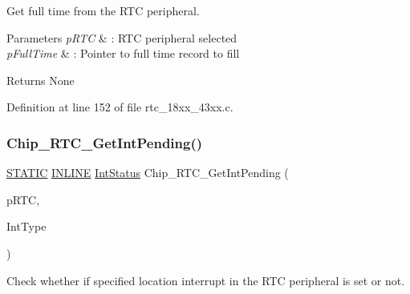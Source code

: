 Get full time from the R\+TC peripheral. 


\begin{DoxyParams}{Parameters}
{\em p\+R\+TC} & \+: R\+TC peripheral selected \\
\hline
{\em p\+Full\+Time} & \+: Pointer to full time record to fill \\
\hline
\end{DoxyParams}
\begin{DoxyReturn}{Returns}
None 
\end{DoxyReturn}


Definition at line 152 of file rtc\+\_\+18xx\+\_\+43xx.\+c.

\mbox{\label{group___r_t_c__18_x_x__43_x_x_gaab21524984ac344d4f508d2dfd6c5098}} 
\subsubsection{\texorpdfstring{Chip\+\_\+\+R\+T\+C\+\_\+\+Get\+Int\+Pending()}{Chip\_RTC\_GetIntPending()}}
{\footnotesize\ttfamily \hyperlink{group___l_p_c___types___public___macros_ga10b2d890d871e1489bb02b7e70d9bdfb}{S\+T\+A\+T\+IC} \hyperlink{spifi__18xx__43xx_8h_a2eb6f9e0395b47b8d5e3eeae4fe0c116}{I\+N\+L\+I\+NE} \hyperlink{group___l_p_c___types___public___types_gab7d263072f745b4f3913fb0afc434c4e}{Int\+Status} Chip\+\_\+\+R\+T\+C\+\_\+\+Get\+Int\+Pending (\begin{DoxyParamCaption}\item[{\hyperlink{struct_l_p_c___r_t_c___t}{L\+P\+C\+\_\+\+R\+T\+C\+\_\+T} $\ast$}]{p\+R\+TC,  }\item[{uint32\+\_\+t}]{Int\+Type }\end{DoxyParamCaption})}



Check whether if specified location interrupt in the R\+TC peripheral is set or not. 


